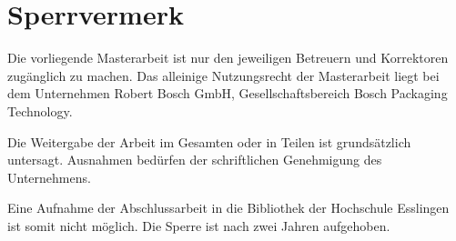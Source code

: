 \chapter*{Sperrvermerk}
\thispagestyle{empty}
Die vorliegende Masterarbeit ist nur den jeweiligen Betreuern und Korrektoren zugänglich zu machen. Das alleinige
Nutzungsrecht der Masterarbeit liegt bei dem Unternehmen Robert Bosch GmbH, Gesellschaftsbereich Bosch Packaging
Technology.

Die Weitergabe der Arbeit im Gesamten oder in Teilen ist grundsätzlich untersagt. Ausnahmen bedürfen der schriftlichen
Genehmigung des Unternehmens.

Eine Aufnahme der Abschlussarbeit in die Bibliothek der Hochschule Esslingen ist somit nicht möglich. Die Sperre ist
nach zwei Jahren aufgehoben.